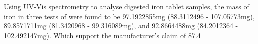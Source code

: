 \documentclass[main.tex]{subfiles}
\begin{document}
Using UV-Vis spectrometry to analyse digested iron tablet samples, the mass of iron in three tests of were found to be 97.1922855mg (88.3112496 - 107.05773mg), 89.8571711mg (81.3420968 - 99.316089mg), and 92.8664488mg (84.2012364 - 102.492147mg). Which support the manufacturer's claim of 87.4
\end{document}
